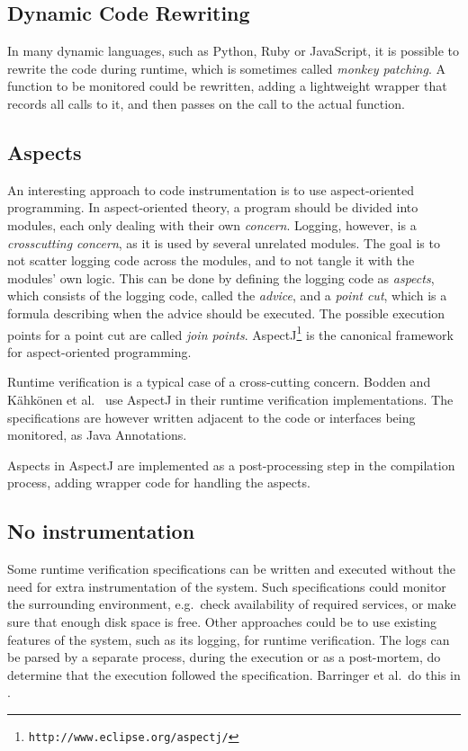 \documentclass[a4paper,11pt]{kth-mag}
\begin{document}
\subsection{Dynamic Code Rewriting}

In many dynamic languages, such as Python, Ruby or JavaScript, it is possible
to rewrite the code during runtime, which is sometimes called \textit{monkey
patching}. A function to be monitored could be rewritten, adding a lightweight
wrapper that records all calls to it, and then passes on the call to the actual
function.


\subsection{Aspects} \label{section-aspects}

An interesting approach to code instrumentation is to use aspect-oriented
programming. In aspect-oriented theory, a program should be divided into
modules, each only dealing with their own \textit{concern}. Logging, however,
is a \textit{crosscutting concern}, as it is used by several unrelated modules.
The goal is to not scatter logging code across the modules, and to not tangle
it with the modules' own logic. This can be done by defining the logging code
as \textit{aspects}, which consists of the logging code, called the
\textit{advice}, and a \textit{point cut}, which is a formula describing when
the advice should be executed. The possible execution points for a point cut
are called \textit{join points}.
AspectJ\footnote{\texttt{http://www.eclipse.org/aspectj/}} is the canonical
framework for aspect-oriented programming.

Runtime verification is a typical case of a cross-cutting concern. Bodden
\cite{bodden05efficientrv} and Kähkönen et al.\ \cite{kahkonen09lime} use
AspectJ in their runtime verification implementations. The specifications are
however written adjacent to the code or interfaces being monitored, as Java
Annotations.

Aspects in AspectJ are implemented as a post-processing step in the compilation
process, adding wrapper code for handling the aspects.


\subsection{No instrumentation}

Some runtime verification specifications can be written and executed without
the need for extra instrumentation of the system. Such specifications could
monitor the surrounding environment, e.g.\ check availability of required
services, or make sure that enough disk space is free. Other approaches could be
to use existing features of the system, such as its logging, for runtime
verification. The logs can be parsed by a separate process, during the
execution or as a post-mortem, do determine that the execution followed the
specification. Barringer et al.\ do this in \cite{barringer09tutorial}.
\end{document}
